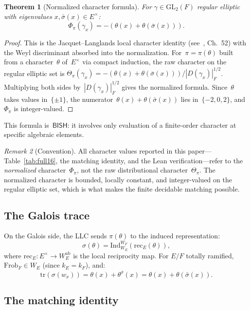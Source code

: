 \documentclass[11pt]{article}
\theoremstyle{plain}
\newtheorem{theorem}{Theorem}[section]
\theoremstyle{definition}
\theoremstyle{remark}
\newtheorem{remark}[theorem]{Remark}
\newcommand{\GL}{\mathrm{GL}}
\newcommand{\Frob}{\mathrm{Frob}}
\newcommand{\tr}{\mathrm{tr}}
\newcommand{\Ind}{\mathrm{Ind}}
\newcommand{\rec}{\mathrm{rec}}
\newcommand{\BISH}{\mathsf{BISH}}
\newcommand{\Phipi}{\Phi_\pi}
\begin{document}
\begin{theorem}[Normalized character formula]\label{thm:char}
For $\gamma \in \GL_2(F)$ regular elliptic with eigenvalues
$x, \bar\sigma(x) \in E^\times$:
\[
  \Phipi(\gamma_x) = -(\theta(x) + \theta(\bar\sigma(x))).
\]
\end{theorem}
\begin{proof}
This is the Jacquet--Langlands local character identity
(see~\cite{BushnellHenniart2006}, Ch.~52)
with the Weyl discriminant absorbed into the normalization.
For~$\pi = \pi(\theta)$ built from a character~$\theta$
of~$E^\times$ via compact induction, the raw character
on the regular elliptic set is
$\Theta_\pi(\gamma_x) = -(\theta(x) + \theta(\bar\sigma(x)))/
|D(\gamma_x)|_F^{1/2}$.
Multiplying both sides by~$|D(\gamma_x)|_F^{1/2}$ gives the
normalized formula.  Since~$\theta$ takes values in~$\{\pm 1\}$,
the numerator~$\theta(x) + \theta(\bar\sigma(x))$ lies
in~$\{-2, 0, 2\}$, and~$\Phipi$ is integer-valued.
\end{proof}

This formula is~$\BISH$: it involves only evaluation of a
finite-order character at specific algebraic elements.

\begin{remark}[Convention]\label{rmk:convention}
All character values reported in this paper---Table~\ref{tab:full16},
the matching identity, and the Lean verification---refer to the
\emph{normalized} character~$\Phipi$, not the raw distributional
character~$\Theta_\pi$.  The normalized character is bounded,
locally constant, and integer-valued on the regular elliptic set,
which is what makes the finite decidable matching possible.
\end{remark}

\subsection{The Galois trace}

On the Galois side, the LLC sends $\pi(\theta)$ to the
induced representation:
\[
  \sigma(\theta) = \Ind_{W_E}^{W_F}(\rec_E(\theta)),
\]
where $\rec_E : E^\times \to W_E^{\mathrm{ab}}$ is the local
reciprocity map.  For $E/F$ totally ramified, $\Frob_F \in W_E$
(since $k_E = k_F$), and:
\[
  \tr(\sigma(w_x)) = \theta(x) + \theta^{\bar\sigma}(x)
  = \theta(x) + \theta(\bar\sigma(x)).
\]

\subsection{The matching identity}
\end{document}
